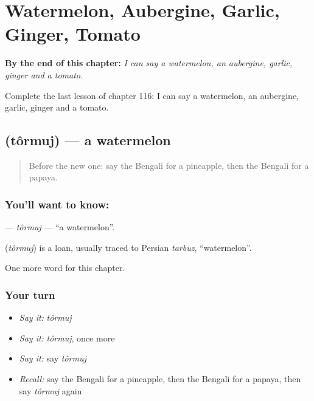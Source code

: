 
\chapter{Watermelon, Aubergine, Garlic, Ginger, Tomato}
\label{ch:bn-watermelon-aubergine-garlic-ginger-tomato}

\begin{chapteropening}
\textbf{By the end of this chapter:} \emph{I can say a watermelon, an aubergine, garlic, ginger and a tomato.}

Complete the last lesson of chapter 116: I can say a watermelon, an aubergine, garlic, ginger and a tomato.
\end{chapteropening}

\section[\texorpdfstring{\bn{তরমুজ} (tôrmuj)}{তরমুজ (tôrmuj)}]{ (tôrmuj) — a watermelon}

\label{lesson:BN-C116-tormuj}



\begin{quote}
Before the new one: say the Bengali for a pineapple, then the Bengali for a papaya.
\end{quote}

\subsection*{You'll want to know: }
\textbf{} — \emph{tôrmuj} — \textquotedblleft{}a watermelon\textquotedblright{}.

\begin{cousinweb}
\textbf{} (\emph{tôrmuj}) is a loan, usually traced to Persian \emph{tarbuz}, \textquotedblleft{}watermelon\textquotedblright{}.
\end{cousinweb}

\begin{grammarlens}[title={What you've built}]
One more word for this chapter.
\end{grammarlens}

\subsection*{Your turn}
\begin{itemize}
\raggedright
  \item \emph{Say it:} \emph{tôrmuj}
  \item \emph{Say it:} \emph{tôrmuj}, once more
  \item \emph{Say it:} say \emph{tôrmuj}
  \item \emph{Recall:} say the Bengali for a pineapple, then the Bengali for a papaya, then say \emph{tôrmuj} again
\end{itemize}

